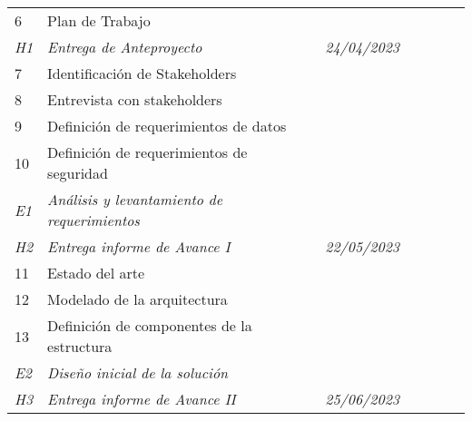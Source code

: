 \begin{table}[H]
{\begin{tabular}{@{}llllllll@{}}
			6                                                  & Plan de Trabajo                                     &                                              &  &  &  &   & \\
			\textit{H1}                                        & \textit{Entrega de Anteproyecto}                    & \multicolumn{2}{c}{\textit{24/04/2023}}      &  &  &  &     \\
			7                                                  & Identificación de Stakeholders                      &                                              &  &  &  &   & \\
			8                                                  & Entrevista con stakeholders                         &                                              &  &  &  &   & \\
			9                                                  & Definición de requerimientos de datos               &                                              &  &  &  &   & \\
			10                                                 & Definición de requerimientos de seguridad           &                                              &  &  &  &   & \\
			\textit{E1}                                        & \textit{Análisis y levantamiento de requerimientos} &                                              &  &  &  &   & \\
			\textit{H2}                                        & \textit{Entrega informe de Avance I}                & \multicolumn{2}{c}{\textit{22/05/2023}}      &  &  &  &     \\
			11                                                 & Estado del arte                                     &                                              &  &  &  &   & \\
			12                                                 & Modelado de la arquitectura                         &                                              &  &  &  &   & \\
			13                                                 & Definición de componentes de la estructura          &                                              &  &  &  &   & \\
			\textit{E2}                                        & \textit{Diseño inicial de la solución}              &                                              &  &  &  &   & \\
			\textit{H3}                                        & \textit{Entrega informe de Avance II}               & \multicolumn{2}{c}{\textit{25/06/2023}}      &  &  &  &     \\

\end{tabular}}
\end{table}
